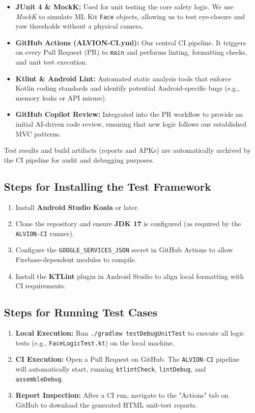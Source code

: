\documentclass[11pt]{report}
\begin{document}
\begin{itemize}
    \item \textbf{JUnit 4 \& MockK:} Used for unit testing the core safety logic. We use \textit{MockK} to simulate ML Kit \texttt{Face} objects, allowing us to test eye-closure and yaw thresholds without a physical camera.
    \item \textbf{GitHub Actions (ALVION-CI.yml):} Our central CI pipeline. It triggers on every Pull Request (PR) to \texttt{main} and performs linting, formatting checks, and unit test execution.
    \item \textbf{Ktlint \& Android Lint:} Automated static analysis tools that enforce Kotlin coding standards and identify potential Android-specific bugs (e.g., memory leaks or API misuse).
    \item \textbf{GitHub Copilot Review:} Integrated into the PR workflow to provide an initial AI-driven code review, ensuring that new logic follows our established MVC patterns.
\end{itemize}

Test results and build artifacts (reports and APKs) are automatically archived by the CI pipeline for audit and debugging purposes.

\subsection{Steps for Installing the Test Framework}  %

\begin{enumerate}
    \item Install \textbf{Android Studio Koala} or later.
    \item Clone the repository and ensure \textbf{JDK 17} is configured (as required by the \texttt{ALVION-CI} runner).
    \item Configure the \texttt{GOOGLE\_SERVICES\_JSON} secret in GitHub Actions to allow Firebase-dependent modules to compile.
    \item Install the \textbf{KTLint} plugin in Android Studio to align local formatting with CI requirements.
\end{enumerate}

\subsection{Steps for Running Test Cases}  %

\begin{enumerate}
    \item \textbf{Local Execution:} Run \texttt{./gradlew testDebugUnitTest} to execute all logic tests (e.g., \texttt{FaceLogicTest.kt}) on the local machine.
    \item \textbf{CI Execution:} Open a Pull Request on GitHub. The \texttt{ALVION-CI} pipeline will automatically start, running \texttt{ktlintCheck}, \texttt{lintDebug}, and \texttt{assembleDebug}.
    \item \textbf{Report Inspection:} After a CI run, navigate to the "Actions" tab on GitHub to download the generated HTML unit-test reports.
\end{enumerate}
\end{document}
